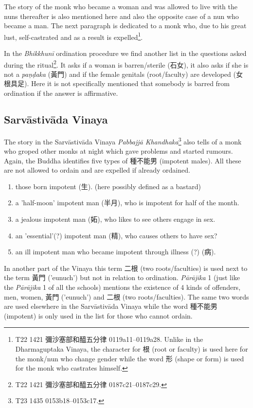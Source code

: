 The story of the monk who became a woman and was allowed to live with the nuns thereafter is also mentioned here and also the opposite case of a nun who became a man. The next paragraph is dedicated to a monk who, due to his great lust, self-castrated and as a result is expelled\footnote{T22 1421 彌沙塞部和醯五分律 0119a11–0119a28. Unlike in the Dharmaguptaka Vinaya, the character for 根 (root or faculty) is used here for the monk/nun who change gender while the word 形 (shape or form) is used for the monk who castrates himself.}. 

In the {\em Bhikkhunī} ordination procedure we find another list in the questions asked during the ritual\footnote{T22 1421 彌沙塞部和醯五分律 0187c21–0187c29.}. It asks if a woman is barren/sterile (石女), it also asks if she is not a {\em paṇḍaka} (黃門) and if the female genitals (root/faculty) are developed (女根具足). Here it is not specifically mentioned that somebody is barred from ordination if the answer is affirmative.

\subsection{Sarvāstivāda Vinaya}
The story in the Sarvāstivāda Vinaya {\em Pabbajjā Khandhaka}\footnote{T23 1435 0153b18–0153c17.} also tells of a monk who groped other monks at night which gave problems and started rumours. Again, the Buddha identifies five types of 種不能男 (impotent males). All these are not allowed to ordain and are expelled if already ordained.

\begin{enumerate}
\item those born impotent (生). (here possibly defined as a bastard)
\item a 'half-moon' impotent man (半月), who is impotent for half of the month.
\item a jealous impotent man (妬), who likes to see others engage in sex.
\item an 'essential'(?) impotent man (精), who causes others to have sex?
\item an ill impotent man who became impotent through illness (?) (病).
\end{enumerate}

In another part of the Vinaya this term 二根 (two roots/faculties) is used next to the term 黃門 ('eunuch') but not in relation to ordination. {\em Pārājika} 1 (just like the {\em Pārājika} 1 of all the schools) mentions the existence of 4 kinds of offenders, men, women, 黃門 ('eunuch') and 二根 (two roots/faculties). The same two words are used elsewhere in the Sarvāstivāda Vinaya while the word 種不能男 (impotent) is only used in the list for those who cannot ordain.

